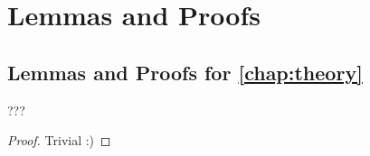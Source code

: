 \chapter{Lemmas and Proofs}

\section{Lemmas and Proofs for \cref{chap:theory}}
\label{section:proofs}

\begin{lemma}[\dots]
???

\label{lem:localltspreservemerge}
\end{lemma}

\begin{proof}
Trivial :)
\end{proof}